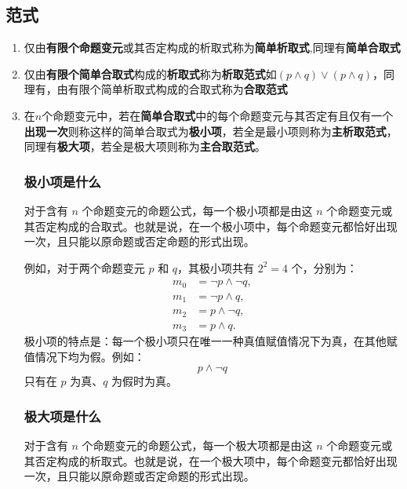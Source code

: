\documentclass{ctexart}
\numberwithin{figure}{section}
\numberwithin{equation}{section}
\numberwithin{table}{section}
\begin{document}
    \subsection{范式}
        \begin{enumerate}
            \item 仅由\textbf{有限个命题变元}或其否定构成的析取式称为\textbf{简单析取式},同理有\textbf{简单合取式}
            \item 仅由\textbf{有限个简单合取式}构成的\textbf{析取式}称为\textbf{析取范式}如$(p\wedge q)\vee(p\wedge q)$，同理有，由有限个简单析取式构成的合取式称为\textbf{合取范式}
            \item 在$n$个命题变元中，若在\textbf{简单合取式}中的每个命题变元与其否定有且仅有一个\textbf{出现一次}则称这样的简单合取式为\textbf{极小项}，若全是最小项则称为\textbf{主析取范式}，同理有\textbf{极大项}，若全是极大项则称为\textbf{主合取范式}。
            \subsubsection{极小项是什么}
                对于含有 $n$ 个命题变元的命题公式，每一个极小项都是由这 $n$ 个命题变元或其否定构成的合取式。也就是说，在一个极小项中，每个命题变元都恰好出现一次，且只能以原命题或否定命题的形式出现。

                例如，对于两个命题变元 $p$ 和 $q$，其极小项共有 $2^2=4$ 个，分别为：
                \[
                \begin{aligned}
                m_0 &= \neg p \land \neg q,\\
                m_1 &= \neg p \land q,\\
                m_2 &= p \land \neg q,\\
                m_3 &= p \land q.
                \end{aligned}
                \]
                极小项的特点是：每一个极小项只在唯一一种真值赋值情况下为真，在其他赋值情况下均为假。例如：
                \[
                p \land \neg q
                \]
                只有在 $p$ 为真、$q$ 为假时为真。

                \subsubsection{极大项是什么}
                对于含有 $n$ 个命题变元的命题公式，每一个极大项都是由这 $n$ 个命题变元或其否定构成的析取式。也就是说，在一个极大项中，每个命题变元都恰好出现一次，且只能以原命题或否定命题的形式出现。


\end{enumerate}
\end{document}
